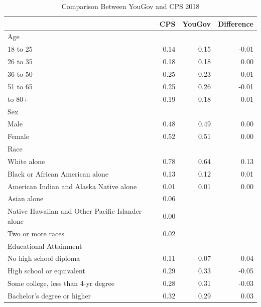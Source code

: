 \begin{table}

\caption{\label{tab:cps_yg}Comparison Between YouGov and CPS 2018}
\centering
\begin{tabular}[t]{lrrr}
\toprule
 & CPS & YouGov & Difference\\
\midrule
Age &  &  & \\
18 to 25 & 0.14 & 0.15 & -0.01\\
26 to 35 & 0.18 & 0.18 & 0.00\\
36 to 50 & 0.25 & 0.23 & 0.01\\
51 to 65 & 0.25 & 0.26 & -0.01\\
\addlinespace
66 to 80+ & 0.19 & 0.18 & 0.01\\
Sex &  &  & \\
Male & 0.48 & 0.49 & 0.00\\
Female & 0.52 & 0.51 & 0.00\\
Race &  &  & \\
\addlinespace
White alone & 0.78 & 0.64 & 0.13\\
Black or African American alone & 0.13 & 0.12 & 0.01\\
American Indian and Alaska Native alone & 0.01 & 0.01 & 0.00\\
Asian alone & 0.06 &  & \\
Native Hawaiian and Other Pacific Islander alone & 0.00 &  & \\
\addlinespace
Two or more races & 0.02 &  & \\
Educational Attainment &  &  & \\
No high school diploma & 0.11 & 0.07 & 0.04\\
High school or equivalent & 0.29 & 0.33 & -0.05\\
Some college, less than 4-yr degree & 0.28 & 0.31 & -0.03\\
\addlinespace
Bachelor's degree or higher & 0.32 & 0.29 & 0.03\\
\bottomrule
\end{tabular}
\end{table}
